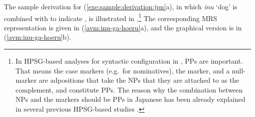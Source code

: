 


The sample derivation for (\ref{exe:sample:derivation:jpn}a), in which
\textit{inu} `dog' is combined with \ga to indicate ,
is illustrated in .\footnote{In HPSG-based
  analyses for syntactic configuration in
  , PPs are
  important. That means the case markers
  (e.g.\ \ga for nominatives), the \wa marker, and a null-marker are
  adpositions that take the NPs that they are attached to as the
  complement, and constitute PPs. The reason why the
  combination between NPs and the markers should be PPs in Japanese
  has been already explained in several previous HPSG-based studies
  \citep{gunji:87,siegel:99,yatabe:99}.}  The corresponding MRS
representation is given in (\ref{avm:inu-ga-hoeru}a), and the
graphical version is in (\ref{avm:inu-ga-hoeru}b).



